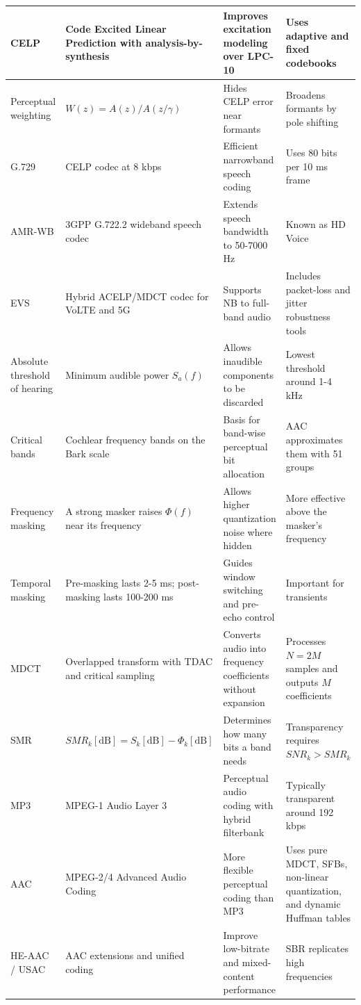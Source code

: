 \begin{center}
\begin{tabular}{|l|l|l|l|}
CELP & Code Excited Linear Prediction with analysis-by-synthesis & Improves excitation modeling over LPC-10 & Uses adaptive and fixed codebooks \\ \hline
Perceptual weighting & $W(z)=A(z)/A(z/\gamma)$ & Hides CELP error near formants & Broadens formants by pole shifting \\ \hline
G.729 & CELP codec at 8 kbps & Efficient narrowband speech coding & Uses 80 bits per 10 ms frame \\ \hline
AMR-WB & 3GPP G.722.2 wideband speech codec & Extends speech bandwidth to 50-7000 Hz & Known as HD Voice \\ \hline
EVS & Hybrid ACELP/MDCT codec for VoLTE and 5G & Supports NB to full-band audio & Includes packet-loss and jitter robustness tools \\ \hline
Absolute threshold of hearing & Minimum audible power $S_a(f)$ & Allows inaudible components to be discarded & Lowest threshold around 1-4 kHz \\ \hline
Critical bands & Cochlear frequency bands on the Bark scale & Basis for band-wise perceptual bit allocation & AAC approximates them with 51 groups \\ \hline
Frequency masking & A strong masker raises $\Phi(f)$ near its frequency & Allows higher quantization noise where hidden & More effective above the masker's frequency \\ \hline
Temporal masking & Pre-masking lasts 2-5 ms; post-masking lasts 100-200 ms & Guides window switching and pre-echo control & Important for transients \\ \hline
MDCT & Overlapped transform with TDAC and critical sampling & Converts audio into frequency coefficients without expansion & Processes $N=2M$ samples and outputs $M$ coefficients \\ \hline
SMR & $SMR_k[\text{dB}]=S_k[\text{dB}]-\Phi_k[\text{dB}]$ & Determines how many bits a band needs & Transparency requires $SNR_k > SMR_k$ \\ \hline
MP3 & MPEG-1 Audio Layer 3 & Perceptual audio coding with hybrid filterbank & Typically transparent around 192 kbps \\ \hline
AAC & MPEG-2/4 Advanced Audio Coding & More flexible perceptual coding than MP3 & Uses pure MDCT, SFBs, non-linear quantization, and dynamic Huffman tables \\ \hline
HE-AAC / USAC & AAC extensions and unified coding & Improve low-bitrate and mixed-content performance & SBR replicates high frequencies \\ \hline

\end{tabular}
\end{center}
